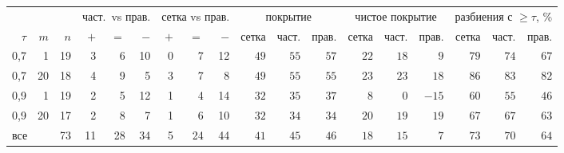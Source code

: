 \begin{tabular}{rrr rrr rrr rrr rrr rrr}
\toprule
& & & \multicolumn{3}{c}{част.\ vs прав.} & \multicolumn{3}{c}{сетка vs прав.} & \multicolumn{3}{c}{покрытие} & \multicolumn{3}{c}{чистое покрытие} & \multicolumn{3}{c}{разбиения с $\ge\tau$, \%}\\
\cmidrule(lr){4-6}\cmidrule(lr){7-9}\cmidrule(lr){10-12}\cmidrule(lr){13-15}\cmidrule(lr){16-18}
$\tau$ & $m$ & $n$ & $+$ & $=$ & $-$ & $+$ & $=$ & $-$ & сетка & част. & прав. & сетка & част. & прав. & сетка & част. & прав.\\
\midrule
0{,}7 & 1 & 19 & 3 & 6 & 10 & 0 & 7 & 12 & $49$ & $55$ & $57$ & $22$ & $18$ & $9$ & $79$ & $74$ & $67$\\
0{,}7 & 20 & 18 & 4 & 9 & 5 & 3 & 7 & 8 & $49$ & $55$ & $55$ & $23$ & $23$ & $18$ & $86$ & $83$ & $82$\\
0{,}9 & 1 & 19 & 2 & 5 & 12 & 1 & 4 & 14 & $32$ & $35$ & $37$ & $8$ & $0$ & $-15$ & $60$ & $55$ & $46$\\
0{,}9 & 20 & 17 & 2 & 8 & 7 & 1 & 6 & 10 & $32$ & $34$ & $34$ & $20$ & $19$ & $19$ & $67$ & $67$ & $63$\\
\midrule
\multicolumn{2}{l}{все} & 73 & 11 & 28 & 34 & 5 & 24 & 44 & $41$ & $45$ & $46$ & $18$ & $15$ & $7$ & $73$ & $70$ & $64$\\
\bottomrule
\end{tabular}
